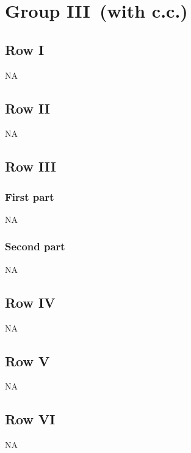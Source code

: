\documentclass[9pt]{article}
\numberwithin{equation}{section}
\begin{document}
\section{Group III\, (with c.c.)}
\subsection{Row I}
\textsc{NA}
\subsection{Row II}
\textsc{NA}
 \subsection{Row III}
\subsubsection{First part}
\textsc{NA}
\subsubsection{Second part}
\textsc{NA}
\subsection{Row IV}
\textsc{NA}
\subsection{Row V}
\textsc{NA}
\subsection{Row VI}
\textsc{NA}
\end{document}
